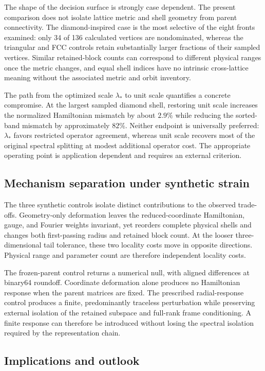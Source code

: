 \documentclass[11pt]{article}
\begin{document}
The shape of the decision surface is strongly case dependent. The present comparison
does not isolate lattice metric and shell geometry from parent connectivity. The
diamond-inspired case is the most selective of the eight fronts examined: only 34 of 136 calculated
vertices are nondominated, whereas the triangular and FCC controls retain substantially
larger fractions of their sampled vertices. Similar retained-block counts can correspond
to different physical ranges once the metric changes, and equal shell indices have no
intrinsic cross-lattice meaning without the associated metric and orbit inventory.

The path from the optimized scale $\lambda_*$ to unit scale quantifies a concrete
compromise. At the largest sampled diamond shell, restoring unit scale increases the
normalized Hamiltonian mismatch by about $2.9\%$ while reducing the sorted-band mismatch
by approximately $82\%$. Neither endpoint is universally preferred: $\lambda_*$ favors
restricted operator agreement, whereas unit scale recovers most of the original
spectral splitting at modest additional operator cost. The appropriate operating point
is application dependent and requires an external criterion.

\subsection{Mechanism separation under synthetic strain}

The three synthetic controls isolate distinct contributions to the observed trade-offs.
Geometry-only deformation leaves the reduced-coordinate Hamiltonian, gauge, and Fourier
weights invariant, yet reorders complete physical shells and changes both first-passing
radius and retained block count. At the looser three-dimensional tail tolerance, these
two locality costs move in opposite directions. Physical range and parameter count are
therefore independent locality costs.

The frozen-parent control returns a numerical null, with aligned differences at
binary64 roundoff. Coordinate deformation alone produces no Hamiltonian response when
the parent matrices are fixed. The prescribed radial-response control produces a finite,
predominantly traceless perturbation while preserving external isolation of the retained
subspace and full-rank frame conditioning. A finite response can therefore be introduced
without losing the spectral isolation required by the representation chain.

\subsection{Implications and outlook}
\end{document}
